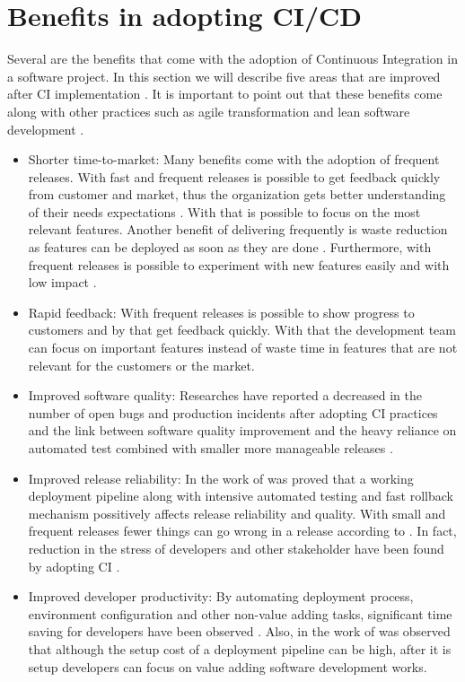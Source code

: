 \section{Benefits in adopting CI/CD}
\label{ci-benefits}

Several are the benefits that come with the adoption of Continuous Integration in a software project. In this section we will describe five areas that are improved after CI implementation \citep{Rejstrom2016}. It is important to point out that these benefits come along with other practices such as agile transformation \citep{Laanti2011} and lean software development \citep{Poppendieck2003}.

\begin{itemize}
\item Shorter time-to-market: Many benefits come with the adoption of frequent releases. With fast and frequent releases is possible to get feedback quickly from customer and market, thus the organization gets better understanding of their needs expectations \citep{Neely2013}. With that is possible to focus on the most relevant features. Another benefit of delivering frequently is waste reduction as features can be deployed as soon as they are done \citep{Leppanen2015}. Furthermore, with frequent releases is possible to experiment with new features easily and with low impact \citep{Neely2013}.
\item Rapid feedback: With frequent releases is possible to show progress to customers and by that get feedback quickly. With that the development team can focus on important features instead of waste time in features that are not relevant for the customers or the market.
\item Improved software quality: Researches have reported a decreased in the number of open bugs and production incidents after adopting CI practices \citep{Mantyla2015} and the link between software quality improvement and the heavy reliance on automated test combined with smaller more manageable releases \citep{Leppanen2015}.
\item Improved release reliability: In the work of \cite{Neely2013} was proved that a working deployment pipeline along with intensive automated testing and fast rollback mechanism possitively affects release reliability and quality. With small and frequent releases fewer things can go wrong in a release according to \cite{Fowler2013}. In fact, reduction in the stress of developers and other stakeholder have been found by adopting CI \citep{Neely2013} \citep{Chen2015}.
\item Improved developer productivity: By automating deployment process, environment configuration and other non-value adding tasks, significant time saving for developers have been observed \citep{Rodriguez2016}. Also, in the work of \cite{Humble2010} was observed that although the setup cost of a deployment pipeline can be high, after it is setup developers can focus on value adding software development works.
\end{itemize}


